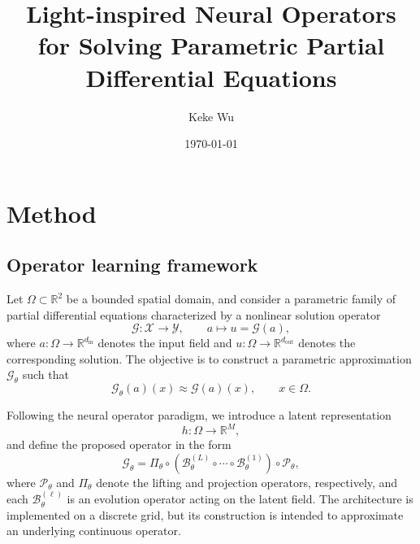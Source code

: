 \documentclass{article}
\begin{document}
\title{Light-inspired Neural Operators for Solving Parametric Partial Differential Equations}

\author[]{Keke Wu}

\date{\today}

\maketitle

\section{Method}

\subsection{Operator learning framework}

Let $\Omega \subset \mathbb{R}^2$ be a bounded spatial domain, and consider a parametric family of partial differential equations characterized by a nonlinear solution operator
\begin{equation}
\mathcal{G} : \mathcal{X} \to \mathcal{Y}, 
\qquad
a \mapsto u = \mathcal{G}(a),
\end{equation}
where $a : \Omega \to \mathbb{R}^{d_{\mathrm{in}}}$ denotes the input field and $u : \Omega \to \mathbb{R}^{d_{\mathrm{out}}}$ denotes the corresponding solution. The objective is to construct a parametric approximation $\mathcal{G}_\theta$ such that
\begin{equation}
\mathcal{G}_\theta(a)(x) \approx \mathcal{G}(a)(x),
\qquad x \in \Omega.
\end{equation}

Following the neural operator paradigm, we introduce a latent representation
\begin{equation}
h : \Omega \to \mathbb{R}^M,
\end{equation}
and define the proposed operator in the form
\begin{equation}
\mathcal{G}_\theta
=
\Pi_\theta
\circ
\left(
\mathcal{B}_\theta^{(L)}
\circ \cdots \circ
\mathcal{B}_\theta^{(1)}
\right)
\circ
\mathcal{P}_\theta,
\label{eq:lno-global}
\end{equation}
where $\mathcal{P}_\theta$ and $\Pi_\theta$ denote the lifting and projection operators, respectively, and each $\mathcal{B}_\theta^{(\ell)}$ is an evolution operator acting on the latent field. The architecture is implemented on a discrete grid, but its construction is intended to approximate an underlying continuous operator.
\end{document}
